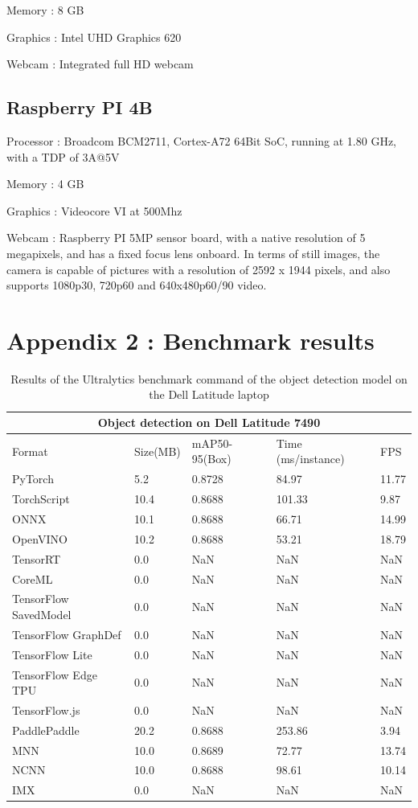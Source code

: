 \documentclass[12pt]{article}
\begin{document}
Memory : 8 GB

Graphics : Intel UHD Graphics 620

Webcam : Integrated full HD webcam

\subsection{Raspberry PI 4B}

Processor : Broadcom BCM2711, Cortex-A72 64Bit SoC, running at 1.80 GHz, with a TDP of 3A@5V

Memory : 4 GB

Graphics : Videocore VI at 500Mhz

Webcam : Raspberry PI 5MP sensor board, with a native resolution of 5 megapixels, and has a fixed focus lens onboard. In terms of still images, the camera is capable of pictures with a resolution of 2592 x 1944 pixels, and also supports 1080p30, 720p60 and 640x480p60/90 video.

\clearpage

\section{Appendix 2 : Benchmark results}
\label{sec:benchmark}

\begin{table}[H]
  \centering
  \begin{tabular}{ |p{3cm}|p{2cm}|p{2cm}|p{3cm}|p{2cm}|  }
    \hline
    \multicolumn{5}{|c|}{Object detection on Dell Latitude 7490} \\
    \hline
    Format& Size(MB) &mAP50-95(Box) &Time (ms/instance) &FPS\\
    \hline
    PyTorch&5.2&0.8728&84.97&11.77 \\
    TorchScript&10.4&0.8688&101.33&9.87 \\
    ONNX&10.1&0.8688&66.71&14.99 \\
    OpenVINO&10.2&0.8688&53.21&18.79 \\
    TensorRT&0.0&NaN&NaN&NaN \\
    CoreML&0.0&NaN&NaN&NaN \\
    TensorFlow SavedModel&0.0&NaN&NaN&NaN \\
    TensorFlow GraphDef&0.0&NaN&NaN&NaN \\
    TensorFlow Lite&0.0&NaN&NaN&NaN \\
    TensorFlow Edge TPU&0.0&NaN&NaN&NaN \\
    TensorFlow.js&0.0&NaN&NaN&NaN \\
    PaddlePaddle&20.2&0.8688&253.86&3.94 \\
    MNN&10.0&0.8689&72.77&13.74 \\
    NCNN&10.0&0.8688&98.61&10.14 \\
    IMX&0.0&NaN&NaN&NaN \\
    \hline
  \end{tabular}
  \caption{Results of the Ultralytics benchmark command of the object detection model on the Dell Latitude laptop}
  \label{table:oddl}
\end{table}
\end{document}

